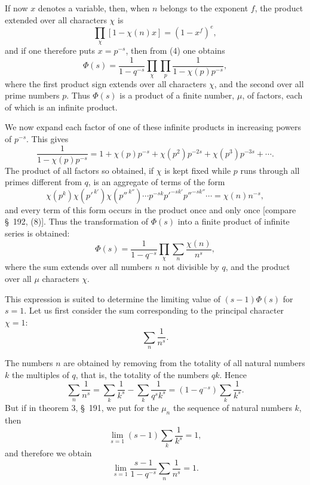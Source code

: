\documentclass[11pt]{article}
\begin{document}
If now $x$ denotes a variable, then, when $n$ belongs to the exponent $f$, the product extended over all characters $\chi$ is
\begin{equation}
\prod_\chi[1-\chi(n)x]=(1-x^f)^e,
\tag{9}
\end{equation}
and if one therefore puts $x=p^{-s}$, then from (4) one obtains
\begin{equation}
\Phi(s)=\frac1{1-q^{-s}}\prod_\chi\prod_p\frac1{1-\chi(p)p^{-s}},
\tag{10}
\end{equation}
where the first product sign extends over all characters $\chi$, and the second over all prime numbers $p$. Thus $\Phi(s)$ is a product of a finite number, $\mu$, of factors, each of which is an infinite product.

We now expand each factor of one of these infinite products in increasing powers of $p^{-s}$. This gives
\[
\frac1{1-\chi(p)p^{-s}}
=1+\chi(p)p^{-s}+\chi(p^2)p^{-2s}+\chi(p^3)p^{-3s}+\cdots .
\]
The product of all factors so obtained, if $\chi$ is kept fixed while $p$ runs through all primes different from $q$, is an aggregate of terms of the form
\[
\chi(p^k)\chi(p'^{\,k'})\chi(p''^{\,k''})\cdots p^{-sk}p'^{-sk'}p''^{-sk''}\cdots
=\chi(n)n^{-s},
\]
and every term of this form occurs in the product once and only once [compare \S~192, (8)]. Thus the transformation of $\Phi(s)$ into a finite product of infinite series is obtained:
\begin{equation}
\Phi(s)=\frac1{1-q^{-s}}\prod_\chi\sum_n\frac{\chi(n)}{n^s},
\tag{11}
\end{equation}
where the sum extends over all numbers $n$ not divisible by $q$, and the product over all $\mu$ characters $\chi$.

This expression is suited to determine the limiting value of $(s-1)\Phi(s)$ for $s=1$. Let us first consider the sum corresponding to the principal character $\chi=1$:
\[
\sum_n\frac1{n^s}.
\]

The numbers $n$ are obtained by removing from the totality of all natural numbers $k$ the multiples of $q$, that is, the totality of the numbers $qk$. Hence
\[
\sum_n\frac1{n^s}=\sum_k\frac1{k^s}-\sum_k\frac1{q^s k^s}
=(1-q^{-s})\sum_k\frac1{k^s}.
\]
But if in theorem 3, \S~191, we put for the $\mu_n$ the sequence of natural numbers $k$, then
\[
\lim_{s=1}(s-1)\sum_k\frac1{k^s}=1,
\]
and therefore we obtain
\begin{equation}
\lim_{s=1}\frac{s-1}{1-q^{-s}}\sum_n\frac1{n^s}=1.
\tag{12}
\end{equation}
\end{document}
